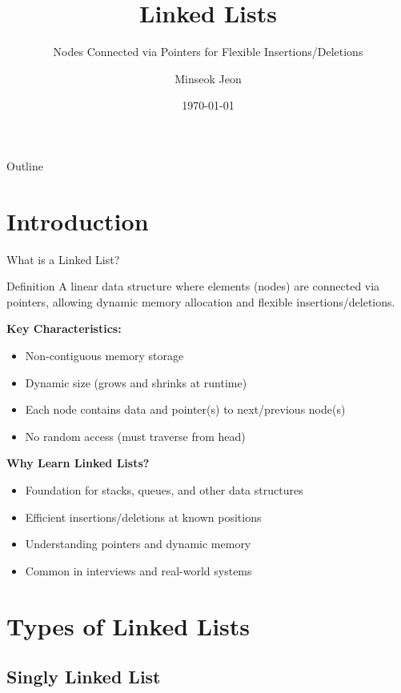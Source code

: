 \documentclass[aspectratio=169,xcolor=dvipsnames]{beamer}
\title{Linked Lists}
\subtitle{Nodes Connected via Pointers for Flexible Insertions/Deletions}
\author{Minseok Jeon}
\institute{DGIST}
\date{\today}
\begin{document}
\begin{frame}
  \titlepage
\end{frame}

\begin{frame}{Outline}
  \tableofcontents
\end{frame}

\section{Introduction}

\begin{frame}{What is a Linked List?}
  \begin{block}{Definition}
    A linear data structure where elements (nodes) are connected via pointers, allowing dynamic memory allocation and flexible insertions/deletions.
  \end{block}

  \vspace{0.3cm}
  \textbf{Key Characteristics:}
  \begin{itemize}
    \item Non-contiguous memory storage
    \item Dynamic size (grows and shrinks at runtime)
    \item Each node contains data and pointer(s) to next/previous node(s)
    \item No random access (must traverse from head)
  \end{itemize}

  \vspace{0.3cm}
  \textbf{Why Learn Linked Lists?}
  \begin{itemize}
    \item Foundation for stacks, queues, and other data structures
    \item Efficient insertions/deletions at known positions
    \item Understanding pointers and dynamic memory
    \item Common in interviews and real-world systems
  \end{itemize}
\end{frame}

\section{Types of Linked Lists}

\subsection{Singly Linked List}
\end{document}
